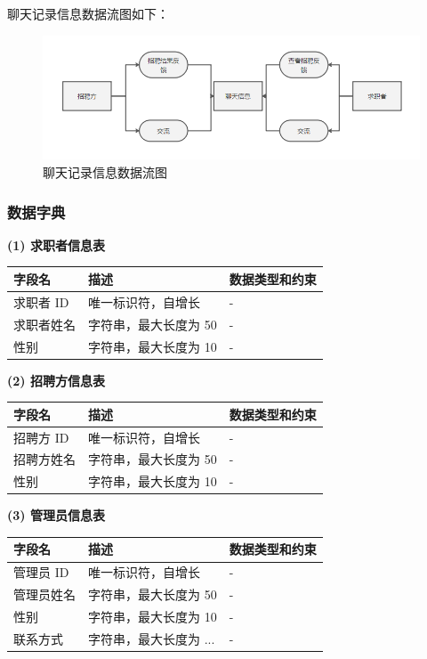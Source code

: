 \documentclass[UTF8,a4paper,10pt]{ctexart}
\begin{document}
聊天记录信息数据流图如下：

\begin{figure}[H]
    \centering
    \includegraphics[width=\textwidth]{img/聊天信息数据流图.png}
    \caption{聊天记录信息数据流图}
    \label{fig:聊天信息数据流图}
\end{figure}

\subsubsection{数据字典}

\textbf{(1) 求职者信息表}\\
\begin{center}
\begin{tabular}{|l|l|l|}
\hline
\textbf{字段名} & \textbf{描述} & \textbf{数据类型和约束} \\
\hline
求职者 ID & 唯一标识符，自增长 & - \\
求职者姓名 & 字符串，最大长度为 50 & - \\
性别 & 字符串，最大长度为 10 & - \\
\hline
\end{tabular}
\end{center}

\textbf{(2) 招聘方信息表}\\
\begin{center}
\begin{tabular}{|l|l|l|}
\hline
字段名 & 描述 & 数据类型和约束 \\
\hline
招聘方 ID & 唯一标识符，自增长 & - \\
招聘方姓名 & 字符串，最大长度为 50 & - \\
性别 & 字符串，最大长度为 10 & - \\
\hline
\end{tabular}
\end{center}

\textbf{(3) 管理员信息表}\\
\begin{center}
\begin{tabular}{|l|l|l|}
\hline
字段名 & 描述 & 数据类型和约束 \\
\hline
管理员 ID & 唯一标识符，自增长 & - \\
管理员姓名 & 字符串，最大长度为 50 & - \\
性别 & 字符串，最大长度为 10 & - \\
联系方式 & 字符串，最大长度为 ... & - \\
\hline
\end{tabular}
\end{center}
\end{document}
